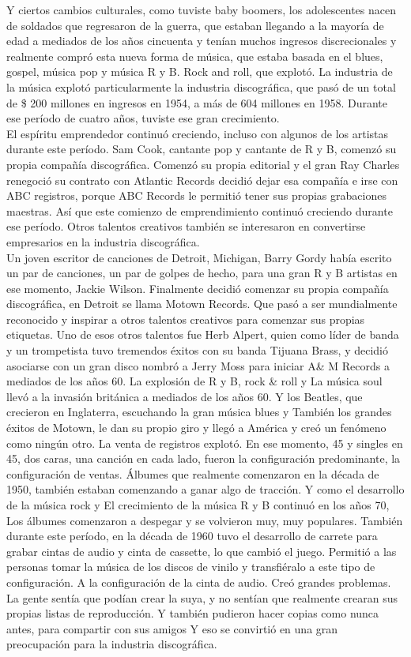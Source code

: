 \documentclass[10pt]{book}
\begin{document}
Y ciertos cambios culturales, como tuviste baby boomers, los adolescentes nacen de soldados que regresaron de la guerra, que estaban llegando a la mayoría de edad a mediados de los años cincuenta y tenían muchos ingresos discrecionales y realmente compró esta nueva forma de música, que estaba basada en el blues, gospel, música pop y música R y B. Rock and roll, que explotó. La industria de la música explotó particularmente la industria discográfica, que pasó de un total de \$ 200 millones en ingresos en 1954, a más de 604 millones en 1958. Durante ese período de cuatro años, tuviste ese gran crecimiento.\\
El espíritu emprendedor continuó creciendo, incluso con algunos de los artistas durante este período. Sam Cook, cantante pop y cantante de R y B, comenzó su propia compañía discográfica. Comenzó su propia editorial y el gran Ray Charles renegoció su contrato con Atlantic Records decidió dejar esa compañía e irse con ABC registros, porque ABC Records le permitió tener sus propias grabaciones maestras. Así que este comienzo de emprendimiento continuó creciendo durante ese período. Otros talentos creativos también se interesaron en convertirse empresarios en la industria discográfica.\\
Un joven escritor de canciones de Detroit, Michigan, Barry Gordy había escrito un par de canciones, un par de golpes de hecho, para una gran R y B artistas en ese momento, Jackie Wilson. Finalmente decidió comenzar su propia compañía discográfica, en Detroit se llama Motown Records. Que pasó a ser mundialmente reconocido y inspirar a otros talentos creativos para comenzar sus propias etiquetas. Uno de esos otros talentos fue Herb Alpert, quien como líder de banda y un trompetista tuvo tremendos éxitos con su banda Tijuana Brass, y decidió asociarse con un gran disco nombró a Jerry Moss para iniciar A\& M Records a mediados de los años 60. La explosión de R y B, rock \& roll y La música soul llevó a la invasión británica a mediados de los años 60. Y los Beatles, que crecieron en Inglaterra, escuchando la gran música blues y También los grandes éxitos de Motown, le dan su propio giro y llegó a América y creó un fenómeno como ningún otro. La venta de registros explotó. En ese momento, 45 y singles en 45, dos caras, una canción en cada lado, fueron la configuración predominante, la configuración de ventas. Álbumes que realmente comenzaron en la década de 1950, también estaban comenzando a ganar algo de tracción. Y como el desarrollo de la música rock y El crecimiento de la música R y B continuó en los años 70, Los álbumes comenzaron a despegar y se volvieron muy, muy populares. También durante este período, en la década de 1960 tuvo el desarrollo de carrete para grabar cintas de audio y cinta de cassette, lo que cambió el juego. Permitió a las personas tomar la música de los discos de vinilo y transfiéralo a este tipo de configuración. A la configuración de la cinta de audio. Creó grandes problemas. La gente sentía que podían crear la suya, y no sentían que realmente crearan sus propias listas de reproducción. Y también pudieron hacer copias como nunca antes, para compartir con sus amigos Y eso se convirtió en una gran preocupación para la industria discográfica.\\
\end{document}
